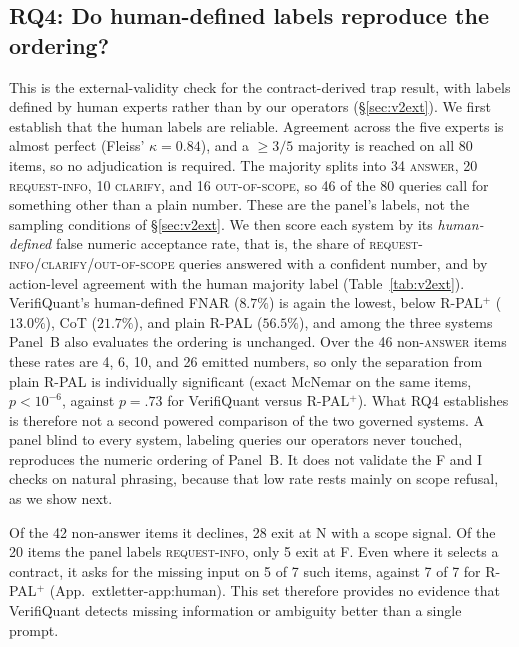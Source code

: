 \documentclass[sigconf]{acmart}
\newif\ifarxiv
\newcommand{\extref}[1]{App.~\ifarxiv\ref{#1}\else\csname extletter-#1\endcsname\fi}
\begin{document}
\subsection{RQ4: Do human-defined labels reproduce the ordering?}\label{sec:v2rq4}
This is the external-validity check for the contract-derived trap result, with labels defined by human experts rather than by our operators (\S\ref{sec:v2ext}).
We first establish that the human labels are reliable. Agreement across the five experts is almost perfect (Fleiss' $\kappa = 0.84$), and a $\ge 3/5$ majority is reached on all 80 items, so no adjudication is required. The majority splits into 34 \textsc{answer}, 20 \textsc{request-info}, 10 \textsc{clarify}, and 16 \textsc{out-of-scope}, so 46 of the 80 queries call for something other than a plain number. These are the panel's labels, not the sampling conditions of \S\ref{sec:v2ext}. We then score each system by its \emph{human-defined} false numeric acceptance rate, that is, the share of \textsc{request-info}/\textsc{clarify}/\textsc{out-of-scope} queries answered with a confident number, and by action-level agreement with the human majority label (Table~\ref{tab:v2ext}).
VerifiQuant's human-defined FNAR ($8.7\%$) is again the lowest, below R-PAL$^{+}$ ($13.0\%$), CoT ($21.7\%$), and plain R-PAL ($56.5\%$), and among the three systems Panel~B also evaluates the ordering is unchanged. Over the 46 non-\textsc{answer} items these rates are 4, 6, 10, and 26 emitted numbers, so only the separation from plain R-PAL is individually significant (exact McNemar on the same items, $p<10^{-6}$, against $p{=}.73$ for VerifiQuant versus R-PAL$^{+}$). What RQ4 establishes is therefore not a second powered comparison of the two governed systems. A panel blind to every system, labeling queries our operators never touched, reproduces the numeric ordering of Panel~B. It does not validate the F and I checks on natural phrasing, because that low rate rests mainly on scope refusal, as we show next.

Of the 42 non-answer items it declines, 28 exit at N with a scope signal. Of the 20 items the panel labels \textsc{request-info}, only 5 exit at F. Even where it selects a contract, it asks for the missing input on 5 of 7 such items, against 7 of 7 for R-PAL$^{+}$ (\extref{app:human}). This set therefore provides no evidence that VerifiQuant detects missing information or ambiguity better than a single prompt.
\end{document}
